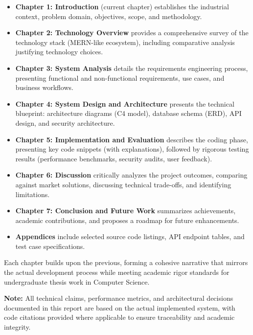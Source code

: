 \documentclass[12pt, a4paper]{report}
\begin{document}
\begin{itemize}
    \item \textbf{Chapter 1: Introduction} (current chapter) establishes the industrial context, problem domain, objectives, scope, and methodology.
    
    \item \textbf{Chapter 2: Technology Overview} provides a comprehensive survey of the technology stack (MERN-like ecosystem), including comparative analysis justifying technology choices.
    
    \item \textbf{Chapter 3: System Analysis} details the requirements engineering process, presenting functional and non-functional requirements, use cases, and business workflows.
    
    \item \textbf{Chapter 4: System Design and Architecture} presents the technical blueprint: architecture diagrams (C4 model), database schema (ERD), API design, and security architecture.
    
    \item \textbf{Chapter 5: Implementation and Evaluation} describes the coding phase, presenting key code snippets (with explanations), followed by rigorous testing results (performance benchmarks, security audits, user feedback).
    
    \item \textbf{Chapter 6: Discussion} critically analyzes the project outcomes, comparing against market solutions, discussing technical trade-offs, and identifying limitations.
    
    \item \textbf{Chapter 7: Conclusion and Future Work} summarizes achievements, academic contributions, and proposes a roadmap for future enhancements.
    
    \item \textbf{Appendices} include selected source code listings, API endpoint tables, and test case specifications.
\end{itemize}

Each chapter builds upon the previous, forming a cohesive narrative that mirrors the actual development process while meeting academic rigor standards for undergraduate thesis work in Computer Science.

\vspace{1cm}
\noindent \textbf{Note:} All technical claims, performance metrics, and architectural decisions documented in this report are based on the actual implemented system, with code citations provided where applicable to ensure traceability and academic integrity.
\end{document}
